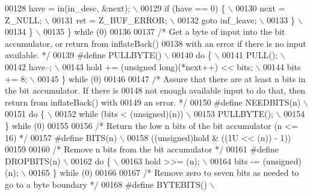 \begin{DoxyCode}
{{{{00128 \textcolor{preprocessor}{            have = in(in\_desc, &next); \(\backslash\)}
00129 \textcolor{preprocessor}{            if (have == 0) \{ \(\backslash\)}
00130 \textcolor{preprocessor}{                next = Z\_NULL; \(\backslash\)}
00131 \textcolor{preprocessor}{                ret = Z\_BUF\_ERROR; \(\backslash\)}
00132 \textcolor{preprocessor}{                goto inf\_leave; \(\backslash\)}
00133 \textcolor{preprocessor}{            \} \(\backslash\)}
00134 \textcolor{preprocessor}{        \} \(\backslash\)}
00135 \textcolor{preprocessor}{    \} while (0)}
00136 
00137 \textcolor{comment}{/* Get a byte of input into the bit accumulator, or return from inflateBack()}
00138 \textcolor{comment}{   with an error if there is no input available. */}
00139 \textcolor{preprocessor}{#define PULLBYTE() \(\backslash\)}
00140 \textcolor{preprocessor}{    do \{ \(\backslash\)}
00141 \textcolor{preprocessor}{        PULL(); \(\backslash\)}
00142 \textcolor{preprocessor}{        have--; \(\backslash\)}
00143 \textcolor{preprocessor}{        hold += (unsigned long)(*next++) << bits; \(\backslash\)}
00144 \textcolor{preprocessor}{        bits += 8; \(\backslash\)}
00145 \textcolor{preprocessor}{    \} while (0)}
00146 
00147 \textcolor{comment}{/* Assure that there are at least n bits in the bit accumulator.  If there is}
00148 \textcolor{comment}{   not enough available input to do that, then return from inflateBack() with}
00149 \textcolor{comment}{   an error. */}
00150 \textcolor{preprocessor}{#define NEEDBITS(n) \(\backslash\)}
00151 \textcolor{preprocessor}{    do \{ \(\backslash\)}
00152 \textcolor{preprocessor}{        while (bits < (unsigned)(n)) \(\backslash\)}
00153 \textcolor{preprocessor}{            PULLBYTE(); \(\backslash\)}
00154 \textcolor{preprocessor}{    \} while (0)}
00155 
00156 \textcolor{comment}{/* Return the low n bits of the bit accumulator (n <= 16) */}
00157 \textcolor{preprocessor}{#define BITS(n) \(\backslash\)}
00158 \textcolor{preprocessor}{    ((unsigned)hold & ((1U << (n)) - 1))}
00159 
00160 \textcolor{comment}{/* Remove n bits from the bit accumulator */}
00161 \textcolor{preprocessor}{#define DROPBITS(n) \(\backslash\)}
00162 \textcolor{preprocessor}{    do \{ \(\backslash\)}
00163 \textcolor{preprocessor}{        hold >>= (n); \(\backslash\)}
00164 \textcolor{preprocessor}{        bits -= (unsigned)(n); \(\backslash\)}
00165 \textcolor{preprocessor}{    \} while (0)}
00166 
00167 \textcolor{comment}{/* Remove zero to seven bits as needed to go to a byte boundary */}
00168 \textcolor{preprocessor}{#define BYTEBITS() \(\backslash\)}
}}}}
\end{DoxyCode}

